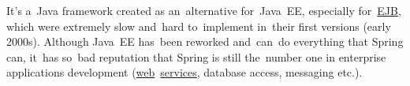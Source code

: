 \label{springframework}
It's a~Java framework created as an~alternative for~Java~EE, especially for~\hyperref[ejb]{EJB}, which were extremely slow and~hard to~implement in~their first versions (early 2000s). Although Java~EE has~been reworked and~can~do everything that Spring can, it~has so~bad reputation that Spring is still the~number one in enterprise applications development (\hyperref[internetweb]{web}~\hyperref[applicationprocessprogramservicethread]{services}, database access, messaging etc.).

